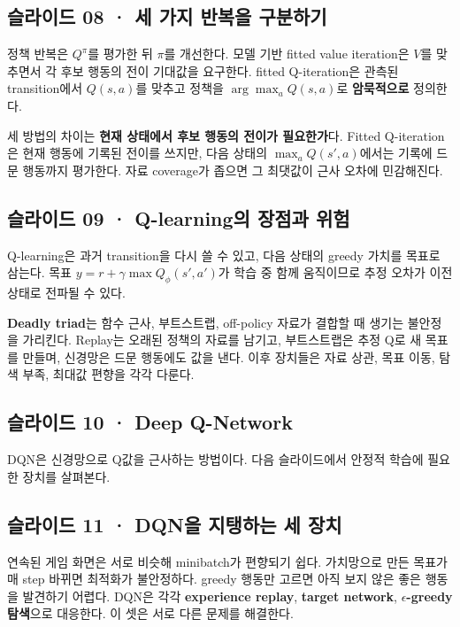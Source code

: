 \documentclass[11pt,a4paper]{article}
\begin{document}
\subsection{슬라이드 08 · 세 가지 반복을 구분하기}

정책 반복은 $Q^\pi$를 평가한 뒤 $\pi$를 개선한다. 모델 기반 fitted value iteration은 $V$를 맞추면서 각 후보 행동의 전이 기대값을 요구한다. fitted Q-iteration은 관측된 transition에서 $Q(s,a)$를 맞추고 정책을 $\arg\max_aQ(s,a)$로 \textbf{암묵적으로} 정의한다.\par

세 방법의 차이는 \textbf{현재 상태에서 후보 행동의 전이가 필요한가}다. Fitted Q-iteration은 현재 행동에 기록된 전이를 쓰지만, 다음 상태의 $\max_aQ(s',a)$에서는 기록에 드문 행동까지 평가한다. 자료 coverage가 좁으면 그 최댓값이 근사 오차에 민감해진다.\par

\subsection{슬라이드 09 · Q-learning의 장점과 위험}

Q-learning은 과거 transition을 다시 쓸 수 있고, 다음 상태의 greedy 가치를 목표로 삼는다. 목표 $y=r+\gamma\max Q_\phi(s',a')$가 학습 중 함께 움직이므로 추정 오차가 이전 상태로 전파될 수 있다.\par

\textbf{Deadly triad}는 함수 근사, 부트스트랩, off-policy 자료가 결합할 때 생기는 불안정을 가리킨다. Replay는 오래된 정책의 자료를 남기고, 부트스트랩은 추정 Q로 새 목표를 만들며, 신경망은 드문 행동에도 값을 낸다. 이후 장치들은 자료 상관, 목표 이동, 탐색 부족, 최대값 편향을 각각 다룬다.\par

\subsection{슬라이드 10 · Deep Q-Network}

DQN은 신경망으로 Q값을 근사하는 방법이다. 다음 슬라이드에서 안정적 학습에 필요한 장치를 살펴본다.\par

\subsection{슬라이드 11 · DQN을 지탱하는 세 장치}

연속된 게임 화면은 서로 비슷해 minibatch가 편향되기 쉽다. 가치망으로 만든 목표가 매 step 바뀌면 최적화가 불안정하다. greedy 행동만 고르면 아직 보지 않은 좋은 행동을 발견하기 어렵다. DQN은 각각 \textbf{experience replay}, \textbf{target network}, \textbf{$\epsilon$-greedy 탐색}으로 대응한다. 이 셋은 서로 다른 문제를 해결한다.\par
\end{document}
